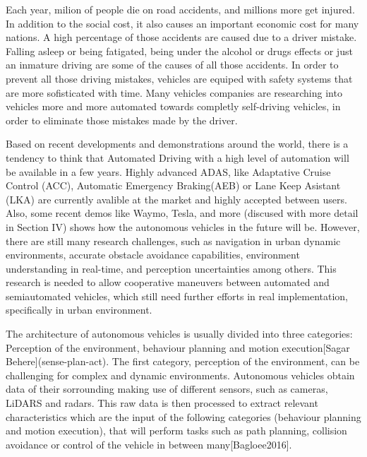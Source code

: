 Each year, milion of people die on road accidents, and millions more get injured. In addition to the social cost, it also causes an important economic cost for many nations. A high percentage of those accidents are caused due to a driver mistake. Falling asleep or being fatigated, being under the alcohol or drugs effects or just an inmature driving are some of the causes of all those accidents. 
In order to prevent all those driving mistakes, vehicles are equiped with safety systems that are more sofisticated with time. Many vehicles companies are researching into vehicles more and more automated towards completly self-driving vehicles, in order to eliminate those mistakes made by the driver.

Based on recent developments and demonstrations around the world, there is a tendency to think that Automated Driving with a high level of automation will be available in a few years. 
Highly advanced ADAS, like Adaptative Cruise Control (ACC), Automatic Emergency Braking(AEB) or Lane Keep Asistant (LKA) are currently avalible at the market and highly accepted between users. Also, some recent demos like Waymo, Tesla, and more (discused with more detail in Section IV) shows how the autonomous vehicles in the future will be.
However, there are still many research challenges, such as navigation in urban dynamic environments, accurate obstacle avoidance capabilities, environment understanding in real-time, and perception uncertainties among others. This research is needed to allow cooperative maneuvers between automated and semiautomated vehicles, which still need further efforts in real implementation, specifically in urban environment. 

The architecture of autonomous vehicles is usually divided into three categories: Perception of the environment, behaviour planning and motion execution[Sagar Behere](sense-plan-act). The first category, perception of the environment, can be challenging for complex and dynamic environments. Autonomous vehicles obtain data of their sorrounding making use of different sensors, such as cameras, LiDARS and radars. This raw data is then processed to extract relevant characteristics which are the input of the following categories (behaviour planning and motion execution), that will perform tasks such as path planning, collision avoidance or control of the vehicle in between many[Bagloee2016].

